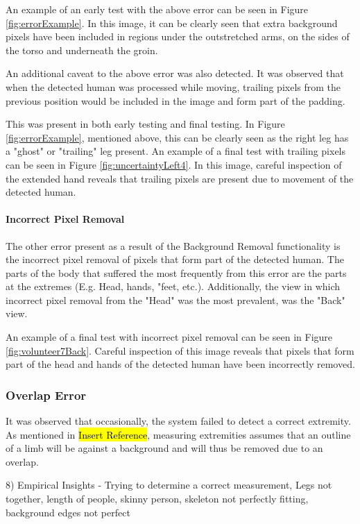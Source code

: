 An example of an early test with the above error can be seen in Figure \ref{fig:errorExample}. In this image, it can be clearly seen that extra background pixels have been included in regions under the outstretched arms, on the sides of the torso and underneath the groin. 

An additional caveat to the above error was also detected. It was observed that when the detected human was processed while moving, trailing pixels from the previous position would be included in the image and form part of the padding.

This was present in both early testing and final testing. In Figure \ref{fig:errorExample}, mentioned above, this can be clearly seen as the right leg has a "ghost" or "trailing" leg present. An example of a final test with trailing pixels can be seen in Figure \ref{fig:uncertaintyLeft4}. In this image, careful inspection of the extended hand reveals that trailing pixels are present due to movement of the detected human.

\paragraph{Incorrect Pixel Removal}
The other error present as a result of the Background Removal functionality is the incorrect pixel removal of pixels that form part of the detected human. The parts of the body that suffered the most frequently from this error are the parts at the extremes (E.g. Head, hands, "feet, etc.). Additionally, the view in which incorrect pixel removal from the "Head" was the most prevalent, was the "Back" view. 

An example of a final test with incorrect pixel removal can be seen in Figure \ref{fig:volunteer7Back}. Careful inspection of this image reveals that pixels that form part of the head and hands of the detected human have been incorrectly removed. 

\subsubsection{Overlap Error}
It was observed that occasionally, the system failed to detect a correct extremity. As mentioned in \hl{Insert Reference}, measuring extremities assumes that an outline of a limb will be against a background and will thus be removed  due to an overlap. 


8) Empirical Insights - Trying to determine a correct measurement, Legs not together, length of people, skinny person, skeleton not perfectly fitting, background edges not perfect \\

